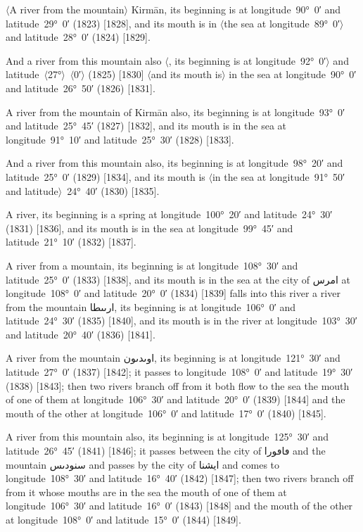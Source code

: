 \documentclass[11pt]{article}
\newcommand{\Pg}[1]{\marginpar{\footnotesize #1}}
\newcommand{\Ang}[1]{\ensuremath{#1}}
\begin{document}
\Ang{\langle}A river from the mountain\Ang{\rangle} Kirmān, its beginning is at longitude~90°~0′ and latitude~29°~0′ (1823) [1828], and its mouth is in \Ang{\langle}the sea at longitude~89°~0′\Ang{\rangle} and latitude~28°~0′ (1824) [1829]\Pg{p. 121}.

And a river from this mountain also \Ang{\langle}, its beginning is at longitude~92°~0′\Ang{\rangle} and latitude~\Ang{\langle}27°\Ang{\rangle}~\Ang{\langle}0′\Ang{\rangle} (1825) [1830] \Ang{\langle}and its mouth is\Ang{\rangle} in the sea at longitude~90°~0′ and latitude~26°~50′ (1826) [1831].

A river from the mountain of Kirmān also, its beginning is at longitude~93°~0′ and latitude~25°~45′ (1827) [1832], and its mouth is in the sea at longitude~91°~10′ and latitude~25°~30′ (1828) [1833].

And a river from this mountain also, its beginning is at longitude~98°~20′ and latitude~25°~0′ (1829) [1834], and its mouth is \Ang{\langle}in the sea at longitude~91°~50′ and latitude\Ang{\rangle}~24°~40′ (1830) [1835].

A river, its beginning is a spring at longitude~100°~20′ and latitude~24°~30′ (1831) [1836], and its mouth is in the sea at longitude~99°~45′ and latitude~21°~10′ (1832) [1837].

A river from a mountain, its beginning is at longitude~108°~30′ and latitude~25°~0′ (1833) [1838], and its mouth is in the sea at the city of \textarabic{امرس} at longitude~108°~0′ and latitude~20°~0′ (1834) [1839] falls into this river a river from the mountain \textarabic{ارٮٮطا}, its beginning is at longitude~106°~0′ and latitude~24°~30′ (1835) [1840], and its mouth is in the river at longitude~103°~30′ and latitude~20°~40′ (1836) [1841].

A river from the mountain \textarabic{اوٮدٮون}, its beginning is at longitude~121°~30′ and latitude~27°~0′ (1837) [1842]; it passes to longitude~108°~0′ and latitude~19°~30′ (1838) [1843]; then two rivers branch off from it both flow to the sea the mouth of one of them at longitude~106°~30′ and latitude~20°~0′ (1839) [1844] and the mouth of the other at longitude~106°~0′ and latitude~17°~0′ (1840) [1845].

\Pg{p. 122}A river from this mountain also, its beginning is at longitude~125°~30′ and latitude~26°~45′ (1841) [1846]; it passes between the city of \textarabic{ڡاڡورا} and the mountain \textarabic{سنودٮس} and passes by the city of \textarabic{ايشنا} and comes to longitude~108°~30′ and latitude~16°~40′ (1842) [1847]; then two rivers branch off from it whose mouths are in the sea the mouth of one of them at longitude~106°~30′ and latitude~16°~0′ (1843) [1848] and the mouth of the other at longitude~108°~0′ and latitude~15°~0′ (1844) [1849].
\end{document}
